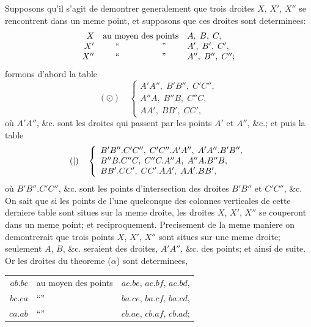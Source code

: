 \documentclass[11pt,a4paper]{book}
\begin{document}
Supposons qu'il s'agit de demontrer generalement que trois droites $X$, $X'$, $X''$ se rencontrent dans un meme point, et supposons que ces droites sont determinees:
\[
\begin{array}{rcl}
X & \text{au moyen des points} & A,\; B,\; C, \\
X' & \text{``\quad\quad\quad\quad\quad''} & A',\; B',\; C', \\
X'' & \text{``\quad\quad\quad\quad\quad''} & A'',\; B'',\; C'';
\end{array}
\]
formons d'abord la table
\[
(\odot)\quad
\left\{
\begin{array}{l}
A'A'',\; B'B'',\; C'C'', \\
A''A,\; B''B,\; C''C, \\
AA',\; BB',\; CC',
\end{array}
\right.
\]
o\`u $A'A''$, \&c. sont les droites qui passent par les points $A'$ et $A''$, \&c.; et puis la table
\[
(\\|)\quad
\left\{
\begin{array}{l}
B'B''.C'C'',\; C'C''.A'A'',\; A'A''.B'B'', \\
B''B.C''C,\; C''C.A''A,\; A''A.B''B, \\
BB'.CC',\; CC'.AA',\; AA'.BB',
\end{array}
\right.
\]
o\`u $B'B''.C'C''$, \&c. sont les points d'intersection des droites $B'B''$ et $C'C''$, \&c. On sait que si les points de l'une quelconque des colonnes verticales de cette derniere table sont situes sur la meme droite, les droites $X$, $X'$, $X''$ se couperont dans un meme point; et reciproquement. Precisement de la meme maniere on demontrerait que trois points $X$, $X'$, $X''$ sont situes sur une meme droite; seulement $A$, $B$, \&c. seraient des droites, $A'A''$, \&c. des points; et ainsi de suite. Or les droites du theoreme ($\alpha$) sont determinees,
\begin{center}
\begin{tabular}{r@{\quad}p{3cm}@{\quad}l}
$ab.bc$ & au moyen des points & $ac.be$,\; $ac.bf$,\; $ac.bd$, \\
$bc.ca$ & ``\quad\quad\quad\quad\quad\quad'' & $ba.ce$,\; $ba.cf$,\; $ba.cd$, \\
$ca.ab$ & ``\quad\quad\quad\quad\quad\quad'' & $cb.ae$,\; $cb.af$,\; $cb.ad$;
\end{tabular}
\end{center}
\clearpage
\end{document}
